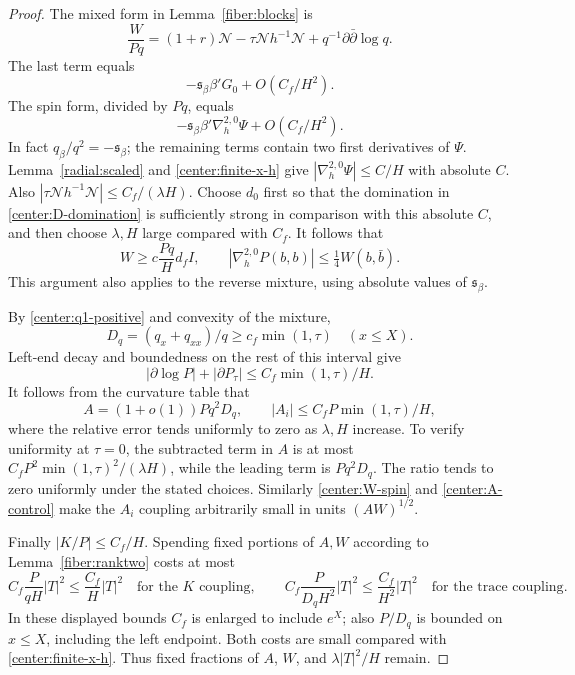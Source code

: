 \begin{proof}
The mixed form in Lemma~\ref{fiber:blocks} is
\[
 \frac{W}{Pq}=(1+r)\mathcal N
       -\tau\mathcal N h^{-1}\mathcal N
       +q^{-1}\partial\bar\partial\log q.
\]
The last term equals
\[
 -\mathfrak s_\beta\beta'G_0+O(C_f/H^2).
\]
The spin form, divided by $Pq$, equals
\[
 -\mathfrak s_\beta\beta'\nabla_h^{2,0}\Psi+O(C_f/H^2).
\]
In fact $q_\beta/q^2=-\mathfrak s_\beta$; the remaining terms contain two first derivatives of $\Psi$. Lemma~\ref{radial:scaled} and \eqref{center:finite-x-h} give
$|\nabla_h^{2,0}\Psi|\le C/H$ with absolute $C$. Also
$|\tau\mathcal N h^{-1}\mathcal N|\le C_f/(\lambda H)$. Choose $d_0$ first so that the domination in \eqref{center:D-domination} is sufficiently strong in comparison with this absolute $C$, and then choose $\lambda,H$ large compared with $C_f$. It follows that
\begin{equation}\label{center:W-spin}
 W\ge c\frac{Pq}{H}d_f I,
 \qquad |\nabla_h^{2,0}P(b,b)|\le\tfrac14 W(b,\bar b).
\end{equation}
This argument also applies to the reverse mixture, using absolute values of $\mathfrak s_\beta$.

By \eqref{center:q1-positive} and convexity of the mixture,
\[
 D_q=(q_x+q_{xx})/q\ge c_f\min(1,\tau)\quad(x\le X).
\]
Left-end decay and boundedness on the rest of this interval give
\[
 |\partial\log P|+|\partial P_\tau|
       \le C_f\min(1,\tau)/H.
\]
It follows from the curvature table that
\begin{equation}\label{center:A-control}
 A=(1+o(1))Pq^2D_q,\qquad
 |A_i|\le C_f P\min(1,\tau)/H,
\end{equation}
where the relative error tends uniformly to zero as $\lambda,H$ increase. To verify uniformity at $\tau=0$, the subtracted term in $A$ is at most
$C_fP^2\min(1,\tau)^2/(\lambda H)$, while the leading term is $Pq^2D_q$. The ratio tends to zero uniformly under the stated choices. Similarly \eqref{center:W-spin} and \eqref{center:A-control} make the $A_i$ coupling arbitrarily small in units $(AW)^{1/2}$.

Finally $|K/P|\le C_f/H$. Spending fixed portions of $A,W$ according to Lemma~\ref{fiber:ranktwo} costs at most
\[
 C_f\frac{P}{qH}|T|^2\le\frac{C_f}{H}|T|^2
 \quad\text{for the }K\text{ coupling},\qquad
 C_f\frac{P}{D_qH^2}|T|^2\le\frac{C_f}{H^2}|T|^2
 \quad\text{for the trace coupling}.
\]
In these displayed bounds $C_f$ is enlarged to include $e^X$; also $P/D_q$ is bounded on $x\le X$, including the left endpoint. Both costs are small compared with \eqref{center:finite-x-h}. Thus fixed fractions of $A$, $W$, and $\lambda|T|^2/H$ remain.


\end{proof}
